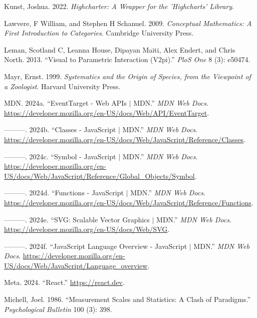 \documentclass[
]{book}
\newlength{\cslhangindent}
\newenvironment{CSLReferences}[2] %
 {\begin{list}{}{%
  \setlength{\itemindent}{0pt}
  \setlength{\leftmargin}{0pt}
  \setlength{\parsep}{0pt}
  \ifodd #1
   \setlength{\leftmargin}{\cslhangindent}
   \setlength{\itemindent}{-1\cslhangindent}
  \fi
  \setlength{\itemsep}{#2\baselineskip}}}
 {\end{list}}
\theoremstyle{definition}
\theoremstyle{definition}
\theoremstyle{definition}
\theoremstyle{definition}
\theoremstyle{remark}
\begin{document}
\begin{CSLReferences}{1}{0}
Kunst, Joshua. 2022. \emph{Highcharter: A Wrapper for the 'Highcharts' Library}.

Lawvere, F William, and Stephen H Schanuel. 2009. \emph{Conceptual Mathematics: A First Introduction to Categories}. Cambridge University Press.

Leman, Scotland C, Leanna House, Dipayan Maiti, Alex Endert, and Chris North. 2013. {``Visual to Parametric Interaction (V2pi).''} \emph{PloS One} 8 (3): e50474.

Mayr, Ernst. 1999. \emph{Systematics and the Origin of Species, from the Viewpoint of a Zoologist}. Harvard University Press.

MDN. 2024a. {``EventTarget - Web APIs {\(\vert\)} MDN.''} \emph{MDN Web Docs}. \url{https://developer.mozilla.org/en-US/docs/Web/API/EventTarget}.

---------. 2024b. {``Classes - JavaScript {\(\vert\)} MDN.''} \emph{MDN Web Docs}. \url{https://developer.mozilla.org/en-US/docs/Web/JavaScript/Reference/Classes}.

---------. 2024c. {``Symbol - JavaScript {\(\vert\)} MDN.''} \emph{MDN Web Docs}. \url{https://developer.mozilla.org/en-US/docs/Web/JavaScript/Reference/Global_Objects/Symbol}.

---------. 2024d. {``Functions - JavaScript {\(\vert\)} MDN.''} \emph{MDN Web Docs}. \url{https://developer.mozilla.org/en-US/docs/Web/JavaScript/Reference/Functions}.

---------. 2024e. {``SVG: Scalable Vector Graphics {\(\vert\)} MDN.''} \emph{MDN Web Docs}. \url{https://developer.mozilla.org/en-US/docs/Web/SVG}.

---------. 2024f. {``JavaScript Language Overview - JavaScript {\(\vert\)} MDN.''} \emph{MDN Web Docs}. \url{https://developer.mozilla.org/en-US/docs/Web/JavaScript/Language_overview}.

Meta. 2024. {``React.''} \url{https://react.dev}.

Michell, Joel. 1986. {``Measurement Scales and Statistics: A Clash of Paradigms.''} \emph{Psychological Bulletin} 100 (3): 398.


\end{CSLReferences}
\end{document}

